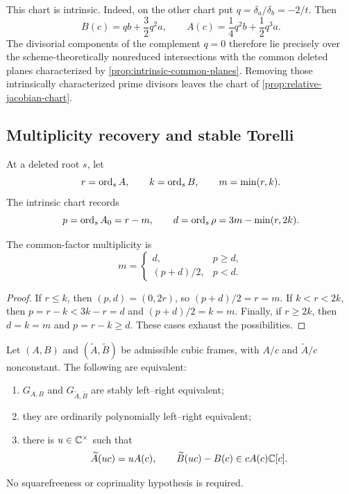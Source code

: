 This chart is intrinsic.  Indeed, on the other chart put
\(q=\delta_a/\delta_b=-2/t\).  Then
\[
B(c)=qb+\frac32q^2a,\qquad
A(c)=\frac14q^2b+\frac12q^3a.
\]
The divisorial components of the complement \(q=0\) therefore lie precisely
over the scheme-theoretically nonreduced intersections with the common
deleted planes characterized by \cref{prop:intrinsic-common-planes}.
Removing those intrinsically characterized prime divisors leaves the chart
of \cref{prop:relative-jacobian-chart}.

\subsection{Multiplicity recovery and stable Torelli}

At a deleted root \(s\), let
\[
r=\operatorname{ord}_sA,\qquad k=\operatorname{ord}_sB,\qquad m=\min(r,k).
\]
The intrinsic chart records
\[
p=\operatorname{ord}_sA_0=r-m,\qquad
d=\operatorname{ord}_s\rho=3m-\min(r,2k).
\]

\begin{lemma}
\label{lem:common-factor-multiplicity}
The common-factor multiplicity is
\[
m=
\begin{cases}
d,&p\ge d,\\[1mm]
(p+d)/2,&p<d.
\end{cases}
\]
\end{lemma}

\begin{proof}
If \(r\le k\), then \((p,d)=(0,2r)\), so \((p+d)/2=r=m\).  If
\(k<r<2k\), then \(p=r-k<3k-r=d\) and \((p+d)/2=k=m\).  Finally, if
\(r\ge2k\), then \(d=k=m\) and \(p=r-k\ge d\).  These cases exhaust the
possibilities.
\end{proof}

\begin{theorem}
\label{thm:all-multiplicity-torelli}
Let \((A,B)\) and \((\widetilde A,\widetilde B)\) be admissible cubic
frames, with \(A/c\) and \(\widetilde A/c\) nonconstant.  The following are
equivalent:
\begin{enumerate}[label=(\roman*)]
\item \(G_{A,B}\) and \(G_{\widetilde A,\widetilde B}\) are stably
left--right equivalent;
\item they are ordinarily polynomially left--right equivalent;
\item there is \(u\in\mathbb C^\times\) such that
\[
\widetilde A(uc)=uA(c),\qquad
\widetilde B(uc)-B(c)\in cA(c)\mathbb C[c].
\]
\end{enumerate}
No squarefreeness or coprimality hypothesis is required.
\end{theorem}

